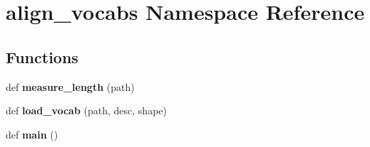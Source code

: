 \hypertarget{namespacealign__vocabs}{}\section{align\+\_\+vocabs Namespace Reference}
\label{namespacealign__vocabs}
\subsection*{Functions}
\begin{DoxyCompactItemize}
\item 
def {\bfseries measure\+\_\+length} (path)\hypertarget{namespacealign__vocabs_afd97529d43cfc41c6f9cf06c36585ea8}{}\label{namespacealign__vocabs_afd97529d43cfc41c6f9cf06c36585ea8}

\item 
def {\bfseries load\+\_\+vocab} (path, desc, shape)\hypertarget{namespacealign__vocabs_aac61f64ebd6e88e9b6573e6331e1ab11}{}\label{namespacealign__vocabs_aac61f64ebd6e88e9b6573e6331e1ab11}

\item 
def {\bfseries main} ()\hypertarget{namespacealign__vocabs_a8ef82afa253ffbc9eb7434b7c163883b}{}\label{namespacealign__vocabs_a8ef82afa253ffbc9eb7434b7c163883b}

\end{DoxyCompactItemize}
